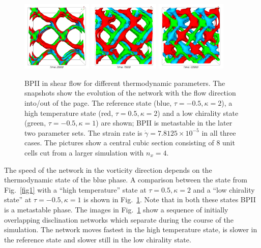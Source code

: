 \documentclass[12pt,twoside]{iopart}
\newcommand{\ex}[1]{\times10^{#1}}
\begin{document}
\begin{figure}[t]
\centering
\includegraphics[width=0.3\textwidth]{disc_bp2_tk_scan_25k.png}
\includegraphics[width=0.3\textwidth]{disc_bp2_tk_scan_75k.png}
\includegraphics[width=0.3\textwidth]{disc_bp2_tk_scan_125k.png}
\caption{BPII in shear flow for different thermodynamic parameters. The
snapshots show the evolution of the network with the flow direction into/out of
the page.  The reference state (blue, $\tau=-0.5, \kappa=2$), a high
temperature state (red, $\tau=0.5, \kappa=2$) and a low chirality state
(green, $\tau=-0.5, \kappa=1$) are shown; BPII is metastable in the later
two parameter sets.
The strain rate is $\dot{\gamma}=7.8125\ex{-5}$ in all three cases.
The pictures show a central cubic section consisting of 8 unit cells cut
from a larger simulation with $n_x=4$.}
\label{fig2}
\end{figure}

The speed of the network in the vorticity direction depends on the
thermodynamic state of the blue phase.
A comparison between the state from Fig.~\ref{fig1} with a
``high temperature'' state at $\tau=0.5, \kappa=2$ and a
``low chirality state'' at $\tau=-0.5, \kappa=1$ is shown in
Fig.~\ref{fig2}. Note that in both these states BPII is a metastable phase. 
The images in Fig.~\ref{fig2} show a sequence of initially overlapping
disclination networks which separate during the course of the simulation.
The network moves fastest in the high temperature state, is slower in the
reference state and slower still in the low chirality state.
\end{document}

